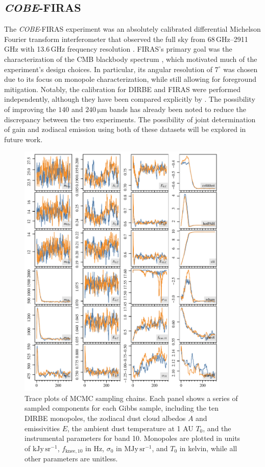 \documentclass{aa}
\def\COBE{\textit{COBE}}
\begin{document}
\subsection{\COBE-FIRAS}

The \COBE-FIRAS experiment was an absolutely calibrated differential Michelson Fourier transform interferometer that observed the full sky from 68\,GHz--2911\,GHz with 13.6\,GHz frequency resolution \citep{fixsen:1994,mather:1999}. 
FIRAS's primary goal was the characterization of the CMB blackbody spectrum \citep{mather:1994}, which motivated much of the experiment's design choices. In particular, its angular resolution of $7^\circ$ was chosen due to its focus on monopole characterization, while still allowing for foreground mitigation. Notably, the calibration for DIRBE and FIRAS were performed independently, although they have been compared explicitly by \citet{fixsen1997}. The possibility of improving the $140$ and $240\,\mathrm{\mu m}$ bands has already been noted to reduce the discrepancy between the two experiments. The possibility of joint determination of gain and zodiacal emission using both of these datasets will be explored in future work.

\begin{figure}
    \centering
    \includegraphics[width=0.9\textwidth]{figs/traceplots.pdf}
	\caption{Trace plots of MCMC sampling chains. Each panel shows a series of sampled components for each Gibbs sample, including the ten DIRBE monopoles, the zodiacal dust cloud albedos $A$ and emissivities $E$, the ambient dust temperature at 1 AU $T_0$, and the instrumental parameters for band 10. Monopoles are plotted in units of $\mathrm{kJy\,sr^{-1}}$, $f_\mathrm{knee,10}$ in Hz, $\sigma_0$ in $\mathrm{MJy\,sr^{-1}}$, and $T_0$ in kelvin, while all other parameters are unitless.}
    \label{fig:trace}
\end{figure}
\end{document}
